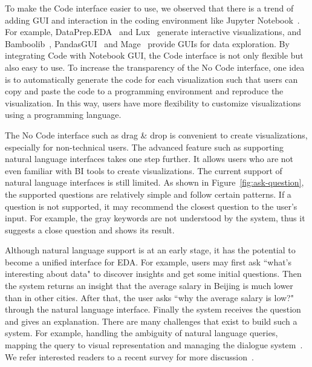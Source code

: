 \documentclass[11pt]{article}
\newcommand{\stitle}[1]{ \noindent{\bf #1.\xspace}}
\begin{document}
To make the Code interface easier to use, we observed that there is a trend of adding GUI and interaction in the coding environment like Jupyter Notebook~\cite{DBLP:conf/chi/KeryRWHP20, DBLP:journals/tvcg/AlspaughZLJH19}. For example, DataPrep.EDA~\cite{DBLP:conf/sigmod/PengWLBYXCRW21} and Lux~\cite{DBLP:journals/pvldb/LeeTABCKMSYHP21} generate interactive visualizations, and Bamboolib~\cite{bamboolib}, PandasGUI~\cite{pandasgui} and Mage~\cite{DBLP:conf/uist/KeryRHMWP20} provide GUIs for data exploration. By integrating Code with Notebook GUI, the Code interface is not only flexible but also easy to use. To increase the transparency of the No Code interface, one idea is to automatically generate the code for each visualization such that users can copy and paste the code to a programming environment and reproduce the visualization. In this way, users have more flexibility to customize visualizations using a programming language.


\stitle{Natural language as a unified interface} The No Code interface such as drag \& drop is convenient to create visualizations, especially for non-technical users. The advanced feature such as supporting natural language interfaces takes one step further. It allows users who are not even familiar with BI tools to create visualizations. The current support of natural language interfaces is still limited. As shown in Figure~\ref{fig:ask-question}, the supported questions are relatively simple and follow certain patterns. If a question is not supported, it may recommend the closest question to the user's input. For example, the gray keywords are not understood by the system, thus it suggests a close question and shows its result. 

Although natural language support is at an early stage, it has the potential to become a unified interface for EDA. For example, users may first ask ``what's interesting about data" to discover insights and get some initial questions. Then the system returns an insight that the average salary in Beijing is much lower than in other cities. After that, the user asks ``why the average salary is low?" through the natural language interface. Finally the system receives the question and gives an explanation. There are many challenges that exist to build such a system. For example, handling the ambiguity of natural language queries, mapping the query to visual representation and managing the dialogue system~\cite{nlpSurvey}. We refer interested readers to a recent survey for more discussion~\cite{nlpSurvey}.
\end{document}
